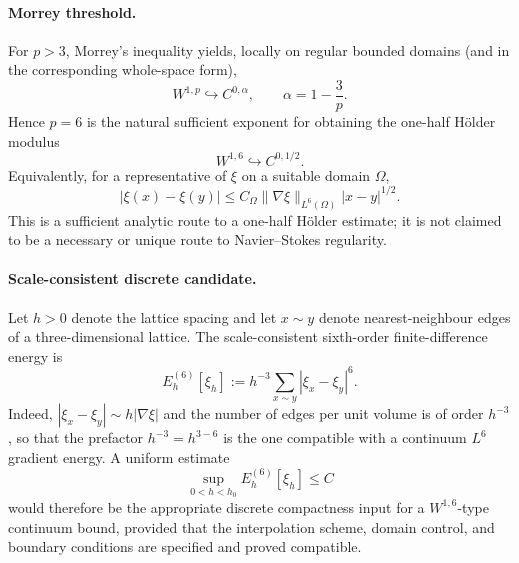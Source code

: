 \documentclass{article}
\begin{document}
\paragraph{Morrey threshold.}
For $p>3$, Morrey's inequality yields, locally on regular bounded domains (and
in the corresponding whole-space form),
\begin{equation}
W^{1,p}\hookrightarrow C^{0,\alpha},
\qquad
\alpha=1-\frac{3}{p}.
\end{equation}
Hence $p=6$ is the natural sufficient exponent for obtaining the one-half
Hölder modulus
\begin{equation}
\boxed{
W^{1,6}\hookrightarrow C^{0,1/2}.
}
\end{equation}
Equivalently, for a representative of $\xi$ on a suitable domain $\Omega$,
\begin{equation}
|\xi(x)-\xi(y)|
\le C_{\Omega}\|\nabla\xi\|_{L^6(\Omega)}|x-y|^{1/2}.
\end{equation}
This is a sufficient analytic route to a one-half Hölder estimate; it is not
claimed to be a necessary or unique route to Navier--Stokes regularity.

\paragraph{Scale-consistent discrete candidate.}
Let $h>0$ denote the lattice spacing and let $x\sim y$ denote nearest-neighbour
edges of a three-dimensional lattice.  The scale-consistent sixth-order
finite-difference energy is
\begin{equation}
\boxed{
E_h^{(6)}[\xi_h]
:=h^{-3}\sum_{x\sim y}|\xi_x-\xi_y|^6.
}
\end{equation}
Indeed, $|\xi_x-\xi_y|\sim h|\nabla\xi|$ and the number of edges per unit
volume is of order $h^{-3}$, so that the prefactor $h^{-3}=h^{3-6}$ is the
one compatible with a continuum $L^6$ gradient energy.  A uniform estimate
\begin{equation}
\sup_{0<h<h_0}E_h^{(6)}[\xi_h]\le C
\label{eq:w16-discrete-gate}
\end{equation}
would therefore be the appropriate discrete compactness input for a
$W^{1,6}$-type continuum bound, provided that the interpolation scheme,
domain control, and boundary conditions are specified and proved compatible.
\end{document}
